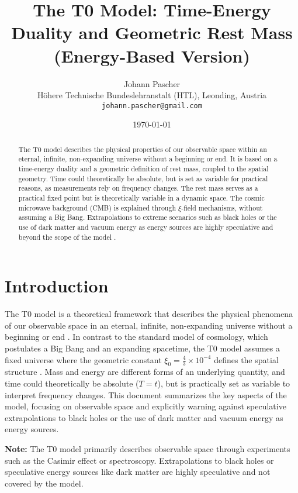\documentclass[12pt,a4paper]{article}
\title{The T0 Model: Time-Energy Duality and Geometric Rest Mass\\
	\large (Energy-Based Version)}
\author{Johann Pascher\\
	\small Höhere Technische Bundeslehranstalt (HTL), Leonding, Austria\\
	\small \texttt{johann.pascher@gmail.com}}
\date{\today}
\begin{document}
	
	\maketitle
	\tableofcontents
	\newpage
	
	\begin{abstract}
		The T0 model describes the physical properties of our observable space within an eternal, infinite, non-expanding universe without a beginning or end. It is based on a time-energy duality and a geometric definition of rest mass, coupled to the spatial geometry. Time could theoretically be absolute, but is set as variable for practical reasons, as measurements rely on frequency changes. The rest mass serves as a practical fixed point but is theoretically variable in a dynamic space. The cosmic microwave background (CMB) is explained through \(\xi\)-field mechanisms, without assuming a Big Bang. Extrapolations to extreme scenarios such as black holes or the use of dark matter and vacuum energy as energy sources are highly speculative and beyond the scope of the model \cite{pascher_t0_energie_2025}.
	\end{abstract}
	
	\section{Introduction}
	The T0 model is a theoretical framework that describes the physical phenomena of our observable space in an eternal, infinite, non-expanding universe without a beginning or end \cite{pascher_t0_energie_2025}. In contrast to the standard model of cosmology, which postulates a Big Bang and an expanding spacetime, the T0 model assumes a fixed universe where the geometric constant \(\xi_0 = \frac{4}{3} \times 10^{-4}\) defines the spatial structure \cite{Casimir1948}. Mass and energy are different forms of an underlying quantity, and time could theoretically be absolute (\( T = t \)), but is practically set as variable to interpret frequency changes. This document summarizes the key aspects of the model, focusing on observable space and explicitly warning against speculative extrapolations to black holes or the use of dark matter and vacuum energy as energy sources.
	
	\textbf{Note:} The T0 model primarily describes observable space through experiments such as the Casimir effect or spectroscopy. Extrapolations to black holes or speculative energy sources like dark matter are highly speculative and not covered by the model.
	
\end{document}
